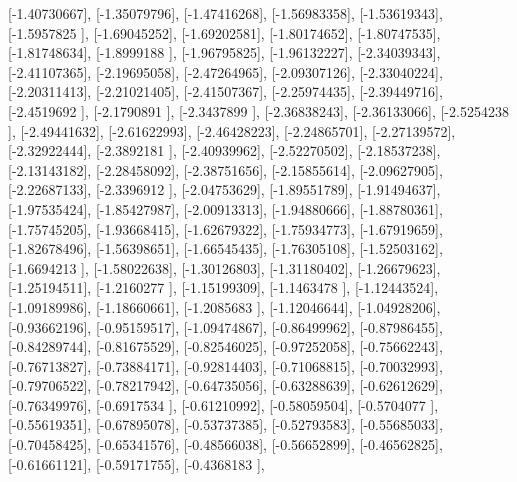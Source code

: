 \documentclass{article}
\begin{document}
       [-1.40730667],
       [-1.35079796],
       [-1.47416268],
       [-1.56983358],
       [-1.53619343],
       [-1.5957825 ],
       [-1.69045252],
       [-1.69202581],
       [-1.80174652],
       [-1.80747535],
       [-1.81748634],
       [-1.8999188 ],
       [-1.96795825],
       [-1.96132227],
       [-2.34039343],
       [-2.41107365],
       [-2.19695058],
       [-2.47264965],
       [-2.09307126],
       [-2.33040224],
       [-2.20311413],
       [-2.21021405],
       [-2.41507367],
       [-2.25974435],
       [-2.39449716],
       [-2.4519692 ],
       [-2.1790891 ],
       [-2.3437899 ],
       [-2.36838243],
       [-2.36133066],
       [-2.5254238 ],
       [-2.49441632],
       [-2.61622993],
       [-2.46428223],
       [-2.24865701],
       [-2.27139572],
       [-2.32922444],
       [-2.3892181 ],
       [-2.40939962],
       [-2.52270502],
       [-2.18537238],
       [-2.13143182],
       [-2.28458092],
       [-2.38751656],
       [-2.15855614],
       [-2.09627905],
       [-2.22687133],
       [-2.3396912 ],
       [-2.04753629],
       [-1.89551789],
       [-1.91494637],
       [-1.97535424],
       [-1.85427987],
       [-2.00913313],
       [-1.94880666],
       [-1.88780361],
       [-1.75745205],
       [-1.93668415],
       [-1.62679322],
       [-1.75934773],
       [-1.67919659],
       [-1.82678496],
       [-1.56398651],
       [-1.66545435],
       [-1.76305108],
       [-1.52503162],
       [-1.6694213 ],
       [-1.58022638],
       [-1.30126803],
       [-1.31180402],
       [-1.26679623],
       [-1.25194511],
       [-1.2160277 ],
       [-1.15199309],
       [-1.1463478 ],
       [-1.12443524],
       [-1.09189986],
       [-1.18660661],
       [-1.2085683 ],
       [-1.12046644],
       [-1.04928206],
       [-0.93662196],
       [-0.95159517],
       [-1.09474867],
       [-0.86499962],
       [-0.87986455],
       [-0.84289744],
       [-0.81675529],
       [-0.82546025],
       [-0.97252058],
       [-0.75662243],
       [-0.76713827],
       [-0.73884171],
       [-0.92814403],
       [-0.71068815],
       [-0.70032993],
       [-0.79706522],
       [-0.78217942],
       [-0.64735056],
       [-0.63288639],
       [-0.62612629],
       [-0.76349976],
       [-0.6917534 ],
       [-0.61210992],
       [-0.58059504],
       [-0.5704077 ],
       [-0.55619351],
       [-0.67895078],
       [-0.53737385],
       [-0.52793583],
       [-0.55685033],
       [-0.70458425],
       [-0.65341576],
       [-0.48566038],
       [-0.56652899],
       [-0.46562825],
       [-0.61661121],
       [-0.59171755],
       [-0.4368183 ],
\end{document}

